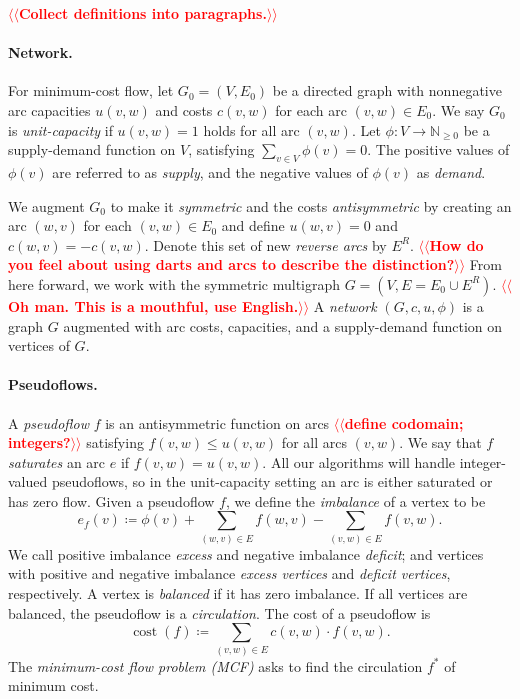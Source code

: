 \documentclass[11pt]{article}
\makeatletter
\def\ints{\mathbb{N}}
\def\fsupply{\phi}
\theoremstyle{plain}
\def\cost{\operatorname{cost}}
\def\n@te#1{\textsf{\boldmath \textbf{$\langle\!\langle$#1$\rangle\!\rangle$}}\leavevmode}
\def\note#1{\textcolor{red}{\n@te{#1}}}
\makeatother
\begin{document}
\note{Collect definitions into paragraphs.}

\paragraph{Network.}
For minimum-cost flow, let $G_0 = (V, E_0)$ be a directed graph with
nonnegative arc capacities $u(v, w)$ and costs $c(v, w)$ for each arc
$(v, w) \in E_0$.
We say $G_0$ is \emph{unit-capacity} if $u(v, w) = 1$ holds for all arc $(v, w)$.
Let $\fsupply: V \to \ints_{\geq 0}$ be a supply-demand function on $V$, satisfying $\sum_{v \in V} \fsupply(v) = 0$.
The positive values of $\fsupply(v)$ are referred to as \emph{supply}, and the negative values of $\fsupply(v)$ as \emph{demand}.

We augment $G_0$ to make it \emph{symmetric}
and the costs
\emph{antisymmetric}
by creating an arc $(w, v)$ for each $(v, w) \in E_0$ and define $u(w, v) = 0$ and $c(w, v) = -c(v, w)$.
Denote this set of new \emph{reverse arcs} by $E^R$.
\note{How do you feel about using darts and arcs to describe the distinction?}
From here forward, we work with the symmetric multigraph
$G = (V, E = E_0 \cup E^R)$. \note{Oh man.  This is a mouthful, use English.}
A \emph{network} $(G, c, u, \fsupply)$ is a graph $G$ augmented with arc costs, capacities, and a supply-demand function on vertices of $G$.

\paragraph{Pseudoflows.}
A \emph{pseudoflow} $f$ is an antisymmetric function on arcs \note{define codomain; integers?}
satisfying $f(v, w) \leq u(v, w)$ for all arcs $(v, w)$.
We say that $f$ \emph{saturates} an arc $e$ if $f(v, w) = u(v, w)$.
All our algorithms will handle integer-valued pseudoflows, so in the
unit-capacity setting an arc is either saturated or has zero flow.
Given a pseudoflow $f$, we define the \emph{imbalance} of a vertex to be
\[
e_f(v) \coloneqq \fsupply(v) + \sum_{(w, v) \in E}{f(w, v)} - \sum_{(v, w) \in E}{f(v, w)}.
\]
We call positive imbalance \emph{excess} and negative imbalance \emph{deficit}; and
vertices with positive and negative imbalance \emph{excess vertices} and \emph{deficit vertices}, respectively.
A vertex is \emph{balanced} if it has zero imbalance.
If all vertices are balanced, the pseudoflow is a \emph{circulation}.
The cost of a pseudoflow is
\[
\cost(f) \coloneqq \sum_{(v, w) \in E} c(v, w) \cdot f(v, w).
\]
The \emph{minimum-cost flow problem (MCF)} asks to find the circulation $f^*$ of
minimum cost.
\end{document}
